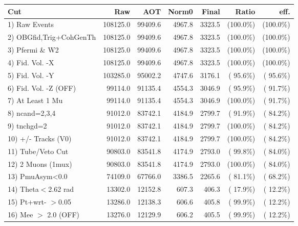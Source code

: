  \begin{table}[h!]\centering
 \begin{tabular}{||l||r|r|r|r|r|r||}
 \hline
 \hline
 Cut & Raw & AOT & Norm0 & Final & Ratio & eff.       \\
 \hline
  1) Raw Events           &     108125.0 &      99409.6 &       4967.8 &       3323.5 & (100.0\%) & (100.0\%) \\
  2) OBGfid,Trig+CohGenTh &     108125.0 &      99409.6 &       4967.8 &       3323.5 & (100.0\%) & (100.0\%) \\
  3) Pfermi \& W2         &     108125.0 &      99409.6 &       4967.8 &       3323.5 & (100.0\%) & (100.0\%) \\
  4) Fid. Vol. -X         &     108125.0 &      99409.6 &       4967.8 &       3323.5 & (100.0\%) & (100.0\%) \\
  5) Fid. Vol. -Y         &     103285.0 &      95002.2 &       4747.6 &       3176.1 & ( 95.6\%) & ( 95.6\%) \\
  6) Fid. Vol. -Z (OFF)   &      99114.0 &      91135.4 &       4554.3 &       3046.9 & ( 95.9\%) & ( 91.7\%) \\
  7) At Least 1 Mu        &      99114.0 &      91135.4 &       4554.3 &       3046.9 & (100.0\%) & ( 91.7\%) \\
  8) ncand=2,3,4          &      91012.0 &      83742.1 &       4184.9 &       2799.7 & ( 91.9\%) & ( 84.2\%) \\
  9) tnchgd=2             &      91012.0 &      83742.1 &       4184.9 &       2799.7 & (100.0\%) & ( 84.2\%) \\
 10) +/- Tracks (V0)      &      91012.0 &      83742.1 &       4184.9 &       2799.7 & (100.0\%) & ( 84.2\%) \\
 11) Tube/Veto Cut        &      90803.0 &      83541.8 &       4174.9 &       2793.0 & ( 99.8\%) & ( 84.0\%) \\
 12) 2 Muons (1mux)       &      90803.0 &      83541.8 &       4174.9 &       2793.0 & (100.0\%) & ( 84.0\%) \\
 13) PmuAsym<0.0          &      74109.0 &      67766.0 &       3386.5 &       2265.6 & ( 81.1\%) & ( 68.2\%) \\
 14) Theta$<$2.62 rad     &      13302.0 &      12152.8 &        607.3 &        406.3 & ( 17.9\%) & ( 12.2\%) \\
 15) Pt+wrt- $>$0.05      &      13286.0 &      12138.3 &        606.6 &        405.8 & ( 99.9\%) & ( 12.2\%) \\
 16) Mee $>$ 2.0  (OFF)   &      13276.0 &      12129.9 &        606.2 &        405.5 & ( 99.9\%) & ( 12.2\%) \\

\end{tabular}
\end{table}
